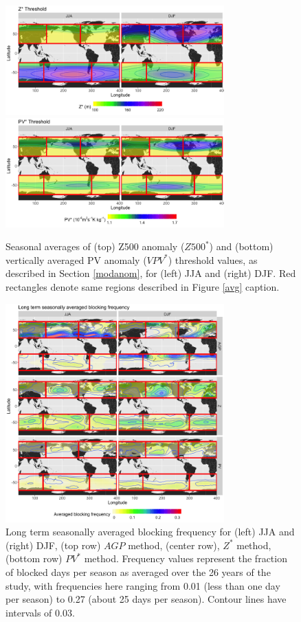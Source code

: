 \documentclass[smallextended]{svjour3}       %
\numberwithin{equation}{section}
\begin{document}
\begin{figure}
\centering
\includegraphics[width=0.75\textwidth]{fig3a}
\includegraphics[width=0.75\textwidth]{fig3b}
\caption{Seasonal averages of (top) Z500 anomaly ($Z500^*$) and (bottom) vertically averaged PV anomaly ($VPV^*$) threshold values, as described in Section \ref{modanom}, for (left) JJA and (right) DJF. Red rectangles denote same regions described in Figure \ref{avg} caption.}\label{thresh}
\end{figure}



\begin{figure}
\centering
\includegraphics[width=0.75\textwidth]{fig4}
\caption{Long term seasonally averaged blocking frequency for (left) JJA and (right) DJF, (top row) $AGP$ method, (center row), $Z^*$ method, (bottom row) $PV^*$ method. Frequency values represent the fraction of blocked days per season as averaged over the 26 years of the study, with frequencies here ranging from 0.01 (less than one day per season) to 0.27 (about 25 days per season). Contour lines have intervals of 0.03.}\label{blockdens} 
\end{figure}
\end{document}

